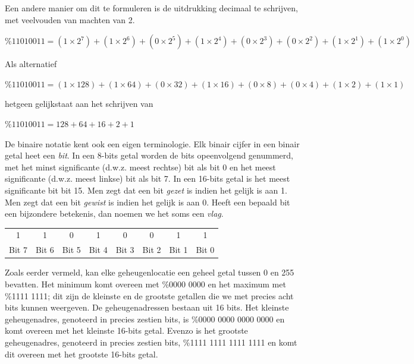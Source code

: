 Een andere manier om dit te formuleren is de uitdrukking decimaal te schrijven, met veelvouden van machten van 2.

\begin{center}
  $\%1101 0011 = (1 \times 2^{7}) + (1 \times 2^{6}) + (0 \times 2^{5}) + (1 \times 2^{4}) + (0 \times 2^{3}) + (0 \times 2^{2}) + (1 \times 2^{1}) + (1 \times 2^{0})$
\end{center}

Als alternatief

\begin{center}
	$\%1101 0011 = (1 \times 128) + (1 \times 64) + (0 \times 32) + (1 \times 16) + (0 \times 8)  + (0 \times 4) + (1 \times 2) + (1 \times 1)$
\end{center}

hetgeen gelijkstaat aan het schrijven van

\begin{center}
  $\%1101 0011 = 128 + 64 + 16 + 2 + 1$
\end{center}

De binaire notatie kent ook een eigen terminologie. Elk binair cijfer in een binair getal heet een {\it bit}. In een 8-bits getal worden de bits opeenvolgend genummerd, met het minst significante (d.w.z. meest rechtse) bit als bit 0 en het meest significante (d.w.z. meest linkse) bit als bit 7. In een 16-bits getal is het meest significante bit bit 15. Men zegt dat een bit {\it gezet} is indien het gelijk is aan 1. Men zegt dat een bit {\it gewist} is indien het gelijk is aan 0. Heeft een bepaald bit een bijzondere betekenis, dan noemen we het soms een {\it vlag}.

\begin{center}
	\begin{tabular}{|c|c|c|c|c|c|c|c|}
		\hline
		1 & 1 & 0 & 1 & 0 & 0 & 1 & 1 \\ \hhline{|=|=|=|=|=|=|=|=|}
		\small{Bit 7} & \small{Bit 6} & \small{Bit 5} & \small{Bit 4} & \small{Bit 3} & \small{Bit 2} & \small{Bit 1} & \small{Bit 0} \\ \hline
	\end{tabular}
\end{center}

Zoals eerder vermeld, kan elke geheugenlocatie een geheel getal tussen 0 en 255 bevatten. Het minimum komt overeen met \%0000 0000 en het maximum met \%1111 1111; dit zijn de kleinste en de grootste getallen die we met precies acht bits kunnen weergeven. De geheugenadressen bestaan uit 16 bits. Het kleinste geheugenadres, genoteerd in precies zestien bits, is \%0000 0000 0000 0000 en komt overeen met het kleinste 16-bits getal. Evenzo is het grootste geheugenadres, genoteerd in precies zestien bits, \%1111 1111 1111 1111 en komt dit overeen met het grootste 16-bits getal.

